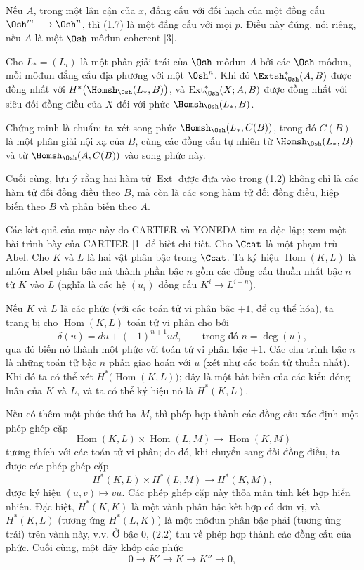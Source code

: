  Nếu $A$, trong một lân cận của $x$, đẳng cấu với
đối hạch của một đồng cấu $\Osh^{m}\longrightarrow\Osh^{n}$, thì (1.7) là một
đẳng cấu với mọi $p$.
Điều này đúng,
nói riêng, nếu $A$ là một $\Osh$-môđun coherent [3].

 Cho $L_{*}=(L_i)$ là một phân giải trái của
$\Osh$-môđun $A$ bởi các $\Osh$-môđun, mỗi môđun đẳng cấu địa phương với
một $\Osh^{n}$. Khi đó $\Extsh_{\Osh}^{*}(A,B)$ được đồng nhất với
$H^{*}\bigl(\Homsh_{\Osh}(L_{*},B)\bigr)$, và
$\operatorname{Ext}_{\Osh}^{*}(X;A,B)$ được đồng nhất với siêu đối đồng điều của $X$
đối với phức $\Homsh_{\Osh}(L_{*},B)$.

Chứng minh là chuẩn: ta xét song phức
$\Homsh_{\Osh}(L_{*},C(B))$, trong đó $C(B)$ là một phân giải nội xạ của $B$, cùng các
đồng cấu tự nhiên từ $\Homsh_{\Osh}(L_{*},B)$ và từ
$\Homsh_{\Osh}(A,C(B))$ vào song phức này.

Cuối cùng, lưu ý rằng hai hàm tử $\operatorname{Ext}$ được đưa vào
trong (1.2) không chỉ là các hàm tử đối đồng điều theo $B$, mà còn là các
song hàm tử đối đồng điều, hiệp biến theo $B$ và phản biến theo $A$.


Các kết quả của mục này do CARTIER và YONEDA tìm ra độc lập; xem
một bài trình bày của CARTIER [1] để biết chi tiết. Cho $\Ccat$ là một phạm trù Abel.
Cho $K$ và $L$ là hai vật phân bậc trong $\Ccat$. Ta ký hiệu
$\operatorname{Hom}(K,L)$ là nhóm Abel phân bậc mà thành phần bậc
$n$ gồm các đồng cấu thuần nhất bậc $n$ từ $K$ vào $L$ (nghĩa là
các hệ $(u_i)$ đồng cấu $K^{i}\longrightarrow L^{i+n}$).

Nếu $K$ và $L$ là các phức (với các toán tử vi phân bậc $+1$, để
cụ thể hóa), ta trang bị cho $\operatorname{Hom}(K,L)$ toán tử
vi phân cho bởi
\begin{equation}\tag{2.1}
  \delta(u)=du+(-1)^{n+1}ud,\qquad\text{trong đó }n=\deg(u),
\end{equation}
qua đó biến nó thành một phức với toán tử vi phân bậc $+1$. Các chu trình
bậc $n$ là những toán tử bậc $n$ phản giao hoán với $u$ (xét như
các toán tử thuần nhất). Khi đó ta có thể xét
$H^{*}\bigl(\operatorname{Hom}(K,L)\bigr)$; đây là một bất biến của các kiểu
đồng luân của $K$ và $L$, và ta có thể ký hiệu nó là $H^{*}(K,L)$.

Nếu có thêm một phức thứ ba $M$, thì phép hợp thành các đồng cấu
xác định một phép ghép cặp
\[
  \operatorname{Hom}(K,L)\times\operatorname{Hom}(L,M)
  \longrightarrow\operatorname{Hom}(K,M)
\]
tương thích với các toán tử vi phân; do đó, khi chuyển sang đối đồng điều,
ta được các phép ghép cặp
\begin{equation}\tag{2.2}
  H^{*}(K,L)\times H^{*}(L,M)\longrightarrow H^{*}(K,M),
\end{equation}
được ký hiệu $(u,v)\longmapsto vu$. Các phép ghép cặp này thỏa mãn tính
kết hợp hiển nhiên. Đặc biệt, $H^{*}(K,K)$ là một vành phân bậc kết hợp
có đơn vị, và $H^{*}(K,L)$ (tương ứng $H^{*}(L,K)$) là một môđun phân bậc phải
(tương ứng trái) trên vành này, v.v. Ở bậc $0$, (2.2) thu về
phép hợp thành các đồng cấu của phức. Cuối cùng, một dãy khớp các
phức
\[
  0\longrightarrow K'\longrightarrow K\longrightarrow K''\longrightarrow 0,
\]

